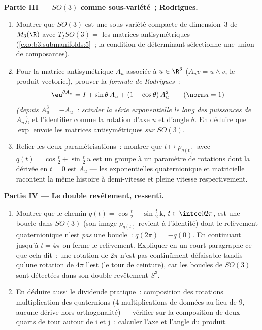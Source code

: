 \begin{problem}
\medskip
\noindent\textbf{Partie III --- $SO(3)$ comme sous-variété~;
Rodrigues.}
\begin{enumerate}[resume]
  \item Montrer que $SO(3)$ est une sous-variété compacte de
        dimension~$3$ de $M_3(\R)$ avec $T_ISO(3) =$ les
        matrices antisymétriques
        (\cref{exo:b3:submanifolds:5}~; la condition de
        déterminant sélectionne une union de composantes).
  \item Pour la matrice antisymétrique $A_u$ associée à $u
        \in \R^3$ ($A_uv = u\wedge v$, le produit vectoriel),
        prouver la \emph{formule de Rodrigues}~:
        \[
        \eu^{\theta A_u} = I + \sin\theta\,A_u + (1 -
        \cos\theta)\,A_u^2 \qquad (\norm u = 1)
        \]
        \emph{(depuis $A_u^3 = -A_u$~: scinder la série
        exponentielle le long des puissances de $A_u$)}, et
        l'identifier comme la rotation d'axe $u$ et d'angle
        $\theta$. En déduire que $\exp$ envoie les matrices
        antisymétriques \emph{sur} $SO(3)$.
  \item Relier les deux paramétrisations~: montrer que $t
        \mapsto \rho_{q(t)}$ avec $q(t) = \cos\frac t2 +
        \sin\frac t2\,u$ est un groupe à un paramètre de
        rotations dont la dérivée en $t = 0$ est $A_u$ ---
        les exponentielles quaternionique et matricielle
        racontent la même histoire à demi-vitesse et pleine
        vitesse respectivement.
\end{enumerate}

\medskip
\noindent\textbf{Partie IV --- Le double revêtement, ressenti.}
\begin{enumerate}[resume]
  \item Montrer que le chemin $q(t) = \cos\frac t2 +
        \sin\frac t2\,\mathrm k$, $t \in \intcc0{2\pi}$,
        est une boucle dans $SO(3)$ (son image $\rho_{q(t)}$
        revient à l'identité) dont le relèvement
        quaternionique n'est \emph{pas} une boucle~:
        $q(2\pi) = -q(0)$. En continuant jusqu'à $t = 4\pi$
        on ferme le relèvement. Expliquer en un court
        paragraphe ce que cela dit~: une rotation de $2\pi$
        n'est pas continûment défaisable tandis qu'une
        rotation de $4\pi$ l'est (le tour de ceinture), car
        les boucles de $SO(3)$ sont détectées dans son
        double revêtement $S^3$.
  \item En déduire aussi le dividende pratique~: composition
        des rotations = multiplication des quaternions
        ($4$ multiplications de données au lieu de $9$,
        aucune dérive hors orthogonalité) --- vérifier sur
        la composition de deux quarts de tour autour de
        $\mathrm i$ et $\mathrm j$~: calculer l'axe et
        l'angle du produit.
\end{enumerate}


\end{problem}
